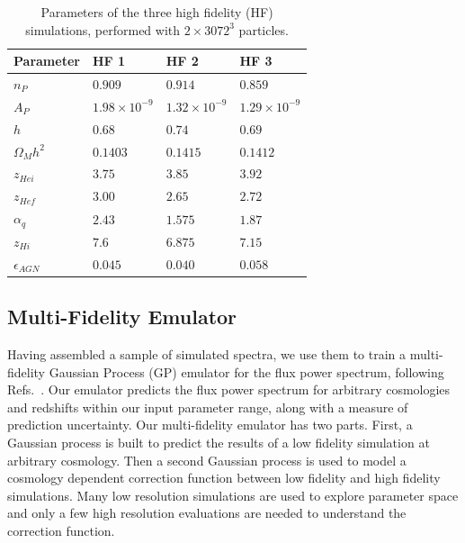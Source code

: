 \documentclass[a4paper,11pt]{article}
\begin{document}
\begin{table}
\begin{centering}
  \begin{tabular}{llll}
  \hline
  Parameter & HF 1 & HF 2 & HF 3\\
    \hline
    $n_P$  &  $0.909$  & $0.914$ & $0.859$ \\
    $A_P$  &  $1.98 \times 10^{-9}$  & $1.32 \times 10^{-9}$ & $1.29 \times 10^{-9}$\\
    $h$    & $0.68$  & $0.74$ & $0.69$\\
    $\Omega_M h^2$ & $0.1403$ & $0.1415$ & $0.1412$\\
    $z_{Hei}$      & $3.75$  & $3.85$  & $ 3.92$ \\
    $z_{Hef}$      & $3.00$  & $2.65$  & $2.72$\\
    $\alpha_q$     & $2.43$  & $1.575$ & $ 1.87$ \\
    $z_{Hi}$        & $7.6$ & $6.875$   & $7.15 $\\
    $\epsilon_{AGN}$ & $0.045$ & $0.040$ & $ 0.058$\\
    \hline
  \end{tabular}
  \caption{Parameters of the three high fidelity (HF) simulations, performed with $2\times 3072^3$ particles.}
  \label{tab:highfidelity}
  \end{centering}
\end{table}

\subsection{Multi-Fidelity Emulator}
\label{sec:gpemulator}

Having assembled a sample of simulated spectra, we use them to train a multi-fidelity Gaussian Process (GP) emulator for the flux power spectrum, following Refs.~\cite{Bird:2019,Ho:2022, Fernandez:2022}. Our emulator predicts the flux power spectrum for arbitrary cosmologies and redshifts within our input parameter range, along with a measure of prediction uncertainty. Our multi-fidelity emulator has two parts. First, a Gaussian process is built to predict the results of a low fidelity simulation at arbitrary cosmology. Then a second Gaussian process is used to model a cosmology dependent correction function between low fidelity and high fidelity simulations. Many low resolution simulations are used to explore parameter space and only a few high resolution evaluations are needed to understand the correction function.
\end{document}
